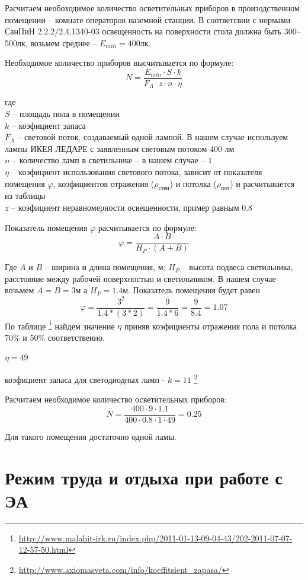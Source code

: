 \documentclass[a4paper,12pt]{report} %
\begin{document}
Расчитаем необоходимое количество осветительных приборов в произодственном
помещении -- комнате операторов наземной станции. В соответсвии с нормами СанПиН
2.2.2/2.4.1340-03 освещенность на поверхности стола должна быть 300--500лк,
возьмем среднее -- $E_{min} = 400лк$.

Необходимое количество приборов высчитывается по формуле:
\[
N = \frac{ E_{min} \cdot S \cdot k }{ F_{\Lambda} \cdot z \cdot n \cdot \eta }
\]

где \\
$S$ -- площадь пола в помещении \\
$k$ -- коэфициент запаса \\
$F_{\Lambda}$ -- световой поток, создаваемый одной лампой. В нашем случае
используем лампы ИКЕЯ ЛЕДАРЕ с заявленным световым потоком $400$ лм \\
$n$ -- количество ламп в светильнике -- в нашем случае -- $1$ \\
$\eta$ -- коэфициент использования светового потока, зависит от показателя
помещения $\varphi$, коэфициентов отражения  ($\rho_{\text{стен}}$) и потолка
($\rho_{\text{пот}}$) и расчитывается из таблицы\\
$z$ -- коэфициент неравномерности освещенности, пример равным $0.8$

Показатель помещения $\varphi$ расчитывается по формуле:
\[
\varphi = \frac{A \cdot B}{H_{P} \cdot (A + B)}
\]

Где $A$ и $B$ -- ширина и длина помещения, м; $H_{P}$ -- высота подвеса
светильника, расстояние между рабочей поверхностью и светильником. В нашем
случае возьмем $A = B = 3\text{м}$ а $H_{P} = 1.4\text{м}$. Показатель помещения
будет равен 
\[
\varphi = \frac{3^2}{1.4*(3*2)} = \frac{9}{1.4*6} = \frac{9}{8.4} = 1.07
\]
По таблице
\footnote{\url{http://www.malahit-irk.ru/index.php/2011-01-13-09-04-43/202-2011-07-07-12-57-50.html}} 
найдем значение $\eta$ приняв коэфициенты отражения пола и потолка 70\% и 50\%
соответственно.

$\eta = 49$

коэфициент запаса для светодиодных ламп - $k = 11$
\footnote{\url{http://www.axiomasveta.com/info/koeffitsient_zapasa/}} 

Расчитаем необходимое количество осветительных приборов:
\[
N = \frac{ 400 \cdot 9 \cdot 1.1 }{ 400 \cdot 0.8 \cdot 1 \cdot 49 } = 0.25
\]

Для такого помещения достаточно одной ламы.
\section{Режим труда и отдыха при работе с ЭА}
\end{document}
